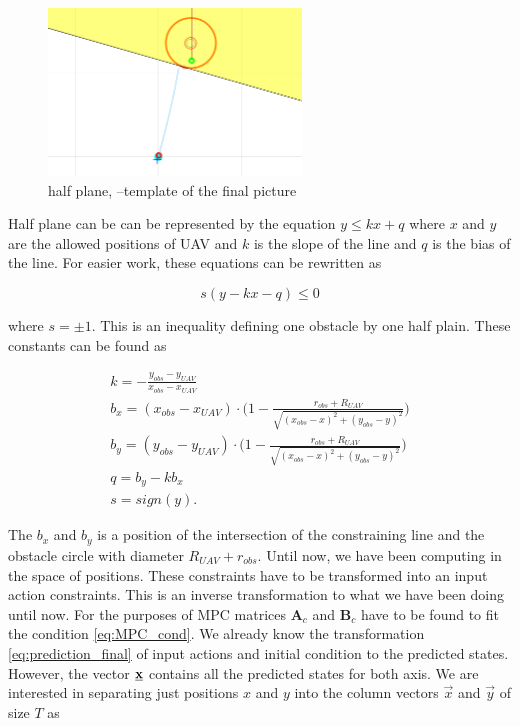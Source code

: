 \documentclass{article}
\begin{document}
\begin{figure}[h]
\begin{center}
\includegraphics[width=0.6\textwidth]{fig/polorovina.png} 
\caption{half plane, --template of the final picture}
\label{fig:half_plain}
\end{center}
\end{figure}

Half plane can be can be represented by the equation $y \leq kx + q$  where $x$ and $y$ are the allowed positions of UAV and $k$ is the slope of the line and $q$ is the bias of the line. For easier work, these equations can be rewritten as

\begin{equation}
\label{eq:simple_obstacle_cond}
s(y - kx - q) \leq 0
\end{equation}

where $s = \pm 1$. This is an inequality defining one obstacle by one half plain. 
These constants can be found as 

\begin{equation}
\label{eq:obstacle_constants}
\begin{split}
k = -\frac{y_{obs} - y_{UAV}}{x_{obs} - x_{UAV}}\\
b_x = (x_{obs}-x_{UAV})\cdot \big(1-\frac{r_{obs}+R_{UAV}}{\sqrt{(x_{obs} - x)^2 + (y_{obs} - y)^2}} \big)\\
b_y = (y_{obs}-y_{UAV})\cdot \big(1-\frac{r_{obs}+R_{UAV}}{\sqrt{(x_{obs} - x)^2 + (y_{obs} - y)^2}} \big)\\
q = b_y - kb_x\\
s = sign(y).
\end{split}
\end{equation}

The $b_x$ and $b_y$ is a position of the intersection of the constraining line and the obstacle circle with diameter $R_{UAV}+r_{obs}$. 
Until now, we have been computing in the space of positions. These constraints have to be transformed into an input action constraints. This is an inverse transformation to what we have been doing until now. For the purposes of MPC matrices $\textbf{A}_c $ and $\textbf{B}_c$ have to be found to fit the condition \ref{eq:MPC_cond}. We already know the transformation \ref{eq:prediction_final} of input actions and initial condition to the predicted states. However, the vector $\textbf{\underline{x}}$ contains all the predicted states for both axis. We are interested in separating just positions $x$ and $y$ into the column vectors $\vec{x}$ and $\vec{y}$ of size $T$ as 
\end{document}
